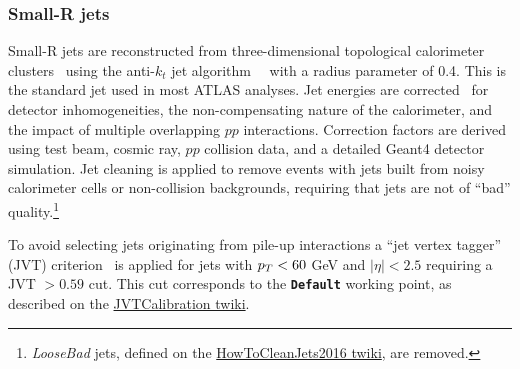 \subsubsection{Small-R jets}
Small-R jets are reconstructed from three-dimensional topological calorimeter 
clusters~\cite{ATLAS-TopoClustering} using the anti-$k_t$ jet 
algorithm~~\cite{antikt_algorithm} with a radius parameter of 0.4. This is the standard jet used in most ATLAS analyses.
Jet energies are corrected~\cite{ATLAS-JES-RUN2} for detector inhomogeneities, the non-compensating nature of the calorimeter, and the impact of multiple overlapping $pp$ interactions. Correction factors are derived using test beam, cosmic ray, $pp$ collision data, and a detailed Geant4 detector simulation.
Jet cleaning is applied to remove events with jets built from noisy
calorimeter cells or non-collision backgrounds, requiring that jets
are not of ``bad'' quality.\footnote{\textit{LooseBad} jets, 
defined on the \href{https://twiki.cern.ch/twiki/bin/view/AtlasProtected/HowToCleanJets2016}{HowToCleanJets2016 twiki}, 
are removed.}

To avoid selecting jets originating from pile-up interactions a ``jet vertex tagger'' (JVT) criterion~\cite{ATLAS-JVTPaper} is applied for jets with $\pt < 60$ GeV and $|\eta|< 2.5$ requiring a JVT $ > 0.59$ cut. This cut corresponds to the \texttt{\textbf{Default}} working point, as described on the \href{https://twiki.cern.ch/twiki/bin/view/AtlasProtected/JVTCalibration}{JVTCalibration twiki}.



